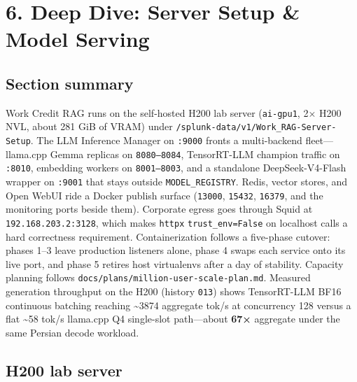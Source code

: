 \chapter{6. Deep Dive: Server Setup \& Model Serving}\label{deep-dive-server-setup-model-serving}

\section{Section summary}\label{section-summary}

Work Credit RAG runs on the self-hosted H200 lab server (\texttt{ai-gpu1}, 2× H200 NVL, about 281 GiB of VRAM) under \texttt{/splunk-data/v1/Work\_RAG-Server-Setup}. The LLM Inference Manager on \texttt{:9000} fronts a multi-backend fleet---llama.cpp Gemma replicas on \texttt{8080–8084}, TensorRT-LLM champion traffic on \texttt{:8010}, embedding workers on \texttt{8001–8003}, and a standalone DeepSeek-V4-Flash wrapper on \texttt{:9001} that stays outside \texttt{MODEL\_REGISTRY}. Redis, vector stores, and Open WebUI ride a Docker publish surface (\texttt{13000}, \texttt{15432}, \texttt{16379}, and the monitoring ports beside them). Corporate egress goes through Squid at \texttt{192.168.203.2:3128}, which makes \texttt{httpx} \texttt{trust\_env=False} on localhost calls a hard correctness requirement. Containerization follows a five-phase cutover: phases 1--3 leave production listeners alone, phase 4 swaps each service onto its live port, and phase 5 retires host virtualenvs after a day of stability. Capacity planning follows \texttt{docs/plans/million-user-scale-plan.md}. Measured generation throughput on the H200 (history \texttt{013}) shows TensorRT-LLM BF16 continuous batching reaching \textasciitilde3874 aggregate tok/s at concurrency 128 versus a flat \textasciitilde58 tok/s llama.cpp Q4 single-slot path---about \textbf{67×} aggregate under the same Persian decode workload.

\section{H200 lab server}\label{h200-lab-server}

